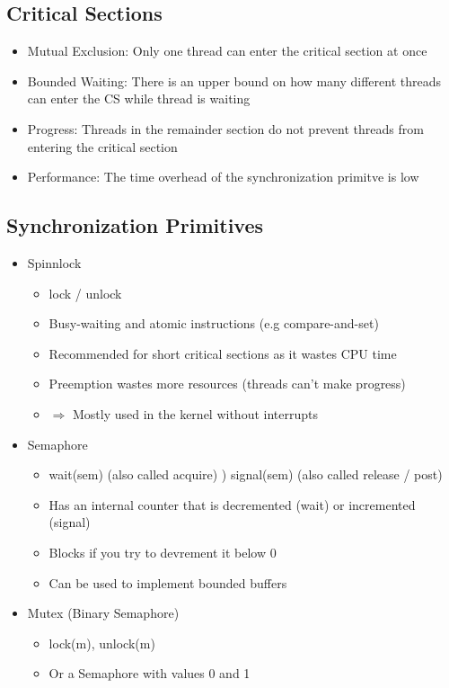 \documentclass{kit}
\begin{document}
  \subsection{Critical Sections}
    \begin{itemize}
      \item Mutual Exclusion: Only one thread can enter the critical section at once
      \item Bounded Waiting: There is an upper bound on how many different threads can enter the CS while thread is waiting
      \item Progress: Threads in the remainder section do not prevent threads from entering the critical section
      \item Performance: The time overhead of the synchronization primitve is low
    \end{itemize}
  \subsection{Synchronization Primitives}
    \begin{itemize}
      \item Spinnlock
        \begin{itemize}
          \item lock / unlock
          \item Busy-waiting and atomic instructions (e.g compare-and-set)
            \item Recommended for short critical sections as it wastes CPU time
            \item Preemption wastes more resources (threads can't make progress)
            \item $\Rightarrow$ Mostly used in the kernel without interrupts
        \end{itemize}
      \item Semaphore
        \begin{itemize}
          \item wait(sem) (also called acquire) ) signal(sem) (also called release / post)
          \item Has an internal counter that is decremented (wait) or incremented (signal)
          \item Blocks if you try to devrement it below 0
          \item Can be used to implement bounded buffers
        \end{itemize}
      \item Mutex (Binary Semaphore)
        \begin{itemize}
          \item lock(m), unlock(m)
          \item Or a Semaphore with values 0 and 1
        \end{itemize}
    \end{itemize}
\end{document}
